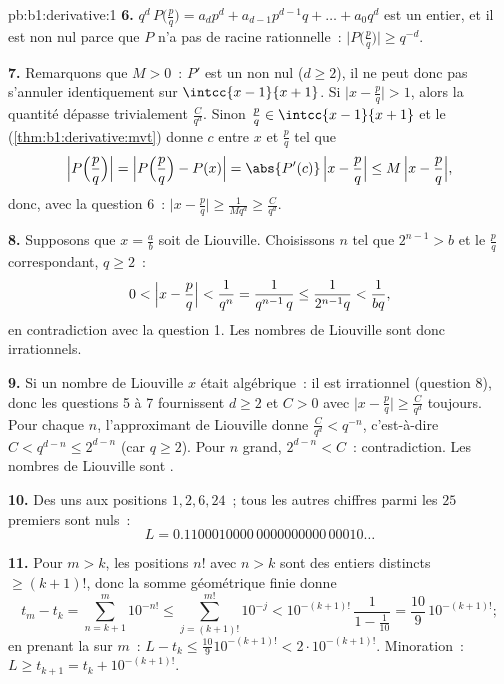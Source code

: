\begin{solution}{pb:b1:derivative:1}
\textbf{6.} $q^d\,P\bigl(\frac pq\bigr) = a_d p^d + a_{d-1}
p^{d-1} q + \dots + a_0 q^d$ est un entier, et il est non nul
parce que $P$ n'a pas de racine rationnelle~: $\bigl|P\bigl(\frac
pq\bigr)\bigr| \geq q^{-d}$.

\textbf{7.} Remarquons que $M > 0$~: $P'$ est un  non nul ($d \geq
2$), il ne peut donc pas s'annuler identiquement sur
$\intcc{x-1}{x+1}$. Si $\bigl|x - \frac pq\bigr| > 1$, alors la quantité
dépasse trivialement $\frac{C}{q^d}$. Sinon $\frac pq \in
\intcc{x-1}{x+1}$ et le 
(\cref{thm:b1:derivative:mvt}) donne $c$ entre $x$ et
$\frac pq$ tel que
\[
\Bigl|P\Bigl(\frac pq\Bigr)\Bigr|
= \Bigl|P\Bigl(\frac pq\Bigr) - P(x)\Bigr|
= \abs{P'(c)}\,\Bigl|x - \frac pq\Bigr|
\leq M\,\Bigl|x - \frac pq\Bigr| ,
\]
donc, avec la question 6~: $\bigl|x - \frac pq\bigr| \geq
\frac{1}{Mq^d} \geq \frac{C}{q^d}$.

\textbf{8.} Supposons que $x = \frac ab$ soit de Liouville. Choisissons $n$ tel que
$2^{n-1} > b$ et le $\frac pq$ correspondant, $q \geq 2$~:
\[
0 < \Bigl|x - \frac pq\Bigr| < \frac{1}{q^n}
= \frac{1}{q^{n-1}\,q} \leq \frac{1}{2^{n-1} q} <
\frac{1}{bq} ,
\]
en contradiction avec la question 1. Les nombres de Liouville sont donc irrationnels.

\textbf{9.} Si un nombre de Liouville $x$ était algébrique~: il est irrationnel
(question 8), donc les questions 5 à 7 fournissent $d \geq 2$ et $C > 0$
avec $\bigl|x - \frac pq\bigr| \geq \frac{C}{q^d}$ toujours. Pour
chaque $n$, l'approximant de Liouville donne $\frac{C}{q^d} <
q^{-n}$, c'est-à-dire $C < q^{d-n} \leq 2^{d-n}$ (car $q \geq 2$). Pour
$n$ grand, $2^{d-n} < C$~: contradiction. Les nombres de Liouville sont
.

\textbf{10.} Des uns aux positions $1, 2, 6, 24$~; tous les autres chiffres
parmi les $25$ premiers sont nuls~:
\[
L = 0.1100010000\,0000000000\,00010\dots
\]

\textbf{11.} Pour $m > k$, les positions $n!$ avec $n > k$ sont des
entiers distincts $\geq (k+1)!$, donc la somme géométrique finie
donne
\[
t_m - t_k = \sum_{n=k+1}^{m} 10^{-n!}
\leq \sum_{j = (k+1)!}^{m!} 10^{-j}
< 10^{-(k+1)!}\,\frac{1}{1 - \frac1{10}}
= \frac{10}{9}\,10^{-(k+1)!} ;
\]
en prenant la  sur $m$~: $L - t_k \leq
\frac{10}{9}10^{-(k+1)!} < 2\cdot10^{-(k+1)!}$. Minoration~: $L
\geq t_{k+1} = t_k + 10^{-(k+1)!}$.


\end{solution}

